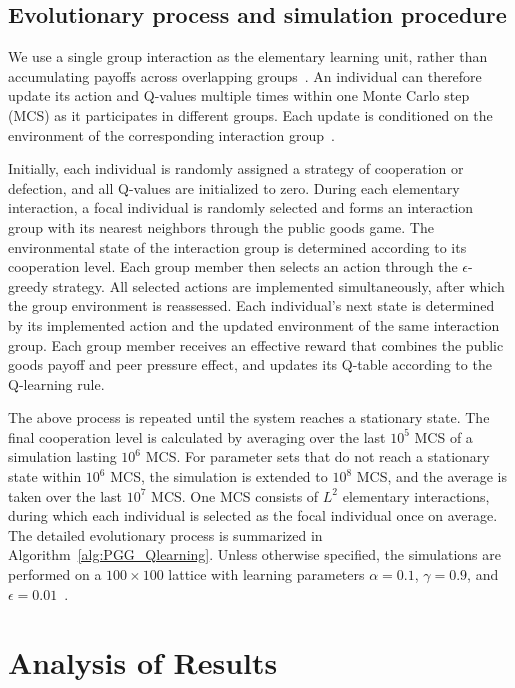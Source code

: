 \documentclass[%
  aip,
  amsmath,amssymb,
  reprint,
  showkeys,
]{revtex4-1}
\begin{document}
\subsection{Evolutionary process and simulation procedure}

We use a single group interaction as the elementary learning unit, rather than accumulating payoffs across overlapping groups~\cite{zhu2024synergy}. An individual can therefore update its action and Q-values multiple times within one Monte Carlo step (MCS) as it participates in different groups. Each update is conditioned on the environment of the corresponding interaction group~\cite{li2025environmental}.

Initially, each individual is randomly assigned a strategy of cooperation or defection, and all Q-values are initialized to zero. During each elementary interaction, a focal individual is randomly selected and forms an interaction group with its nearest neighbors through the public goods game. The environmental state of the interaction group is determined according to its cooperation level. Each group member then selects an action through the $\epsilon$-greedy strategy. All selected actions are implemented simultaneously, after which the group environment is reassessed. Each individual's next state is determined by its implemented action and the updated environment of the same interaction group. Each group member receives an effective reward that combines the public goods payoff and peer pressure effect, and updates its Q-table according to the Q-learning rule.

The above process is repeated until the system reaches a stationary state. The final cooperation level is calculated by averaging over the last $10^5$ MCS of a simulation lasting $10^6$ MCS. For parameter sets that do not reach a stationary state within $10^6$ MCS, the simulation is extended to $10^8$ MCS, and the average is taken over the last $10^7$ MCS. One MCS consists of $L^2$ elementary interactions, during which each individual is selected as the focal individual once on average. The detailed evolutionary process is summarized in Algorithm~\ref{alg:PGG_Qlearning}. Unless otherwise specified, the simulations are performed on a $100\times100$ lattice with learning parameters $\alpha=0.1$, $\gamma=0.9$, and $\epsilon=0.01$~\cite{zhao2024emergence,zheng2024evolution,li2025environmental}.




\section{Analysis of Results}\label{sec3}
\end{document}
